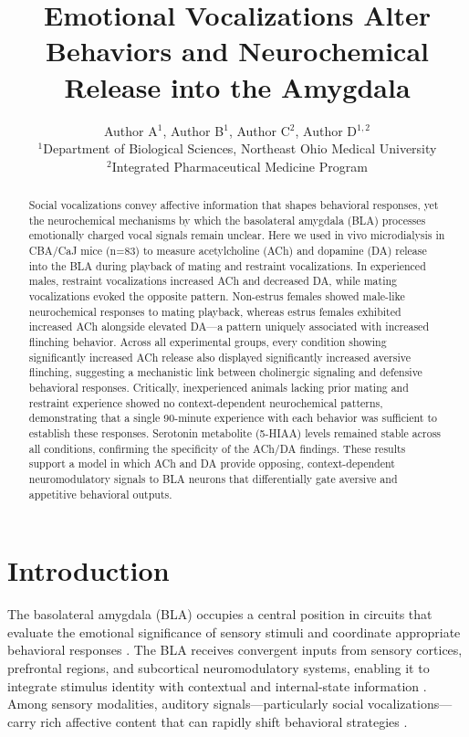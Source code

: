 \documentclass[11pt]{article}
\title{Emotional Vocalizations Alter Behaviors and Neurochemical Release into the Amygdala}
\author{Author A$^{1}$, Author B$^{1}$, Author C$^{2}$, Author D$^{1,2}$\\[6pt]
$^{1}$Department of Biological Sciences, Northeast Ohio Medical University\\
$^{2}$Integrated Pharmaceutical Medicine Program}
\date{}
\begin{document}
\maketitle

\begin{abstract}
Social vocalizations convey affective information that shapes behavioral responses, yet the neurochemical mechanisms by which the basolateral amygdala (BLA) processes emotionally charged vocal signals remain unclear. Here we used in vivo microdialysis in CBA/CaJ mice (n=83) to measure acetylcholine (ACh) and dopamine (DA) release into the BLA during playback of mating and restraint vocalizations. In experienced males, restraint vocalizations increased ACh and decreased DA, while mating vocalizations evoked the opposite pattern. Non-estrus females showed male-like neurochemical responses to mating playback, whereas estrus females exhibited increased ACh alongside elevated DA---a pattern uniquely associated with increased flinching behavior. Across all experimental groups, every condition showing significantly increased ACh release also displayed significantly increased aversive flinching, suggesting a mechanistic link between cholinergic signaling and defensive behavioral responses. Critically, inexperienced animals lacking prior mating and restraint experience showed no context-dependent neurochemical patterns, demonstrating that a single 90-minute experience with each behavior was sufficient to establish these responses. Serotonin metabolite (5-HIAA) levels remained stable across all conditions, confirming the specificity of the ACh/DA findings. These results support a model in which ACh and DA provide opposing, context-dependent neuromodulatory signals to BLA neurons that differentially gate aversive and appetitive behavioral outputs.
\end{abstract}

\section{Introduction}

The basolateral amygdala (BLA) occupies a central position in circuits that evaluate the emotional significance of sensory stimuli and coordinate appropriate behavioral responses \citep{janak2015amygdala, ledoux2000emotion, phelps2005contributions}. The BLA receives convergent inputs from sensory cortices, prefrontal regions, and subcortical neuromodulatory systems, enabling it to integrate stimulus identity with contextual and internal-state information \citep{mcdonald1998cortical, sah2003amygdaloid}. Among sensory modalities, auditory signals---particularly social vocalizations---carry rich affective content that can rapidly shift behavioral strategies \citep{portfors2007types, willmore2023vocal}.
\end{document}
